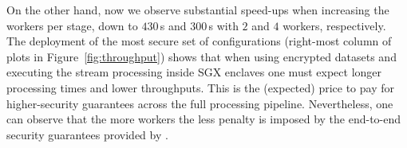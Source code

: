 On the other hand, now we observe substantial speed-ups when increasing the workers per stage, down to $430$\,s and $300$\,s with $2$ and $4$ workers, respectively.
% 
The deployment of the most secure set of configurations (right-most column of plots in Figure~\ref{fig:throughput}) shows that when using encrypted datasets and executing the stream processing inside SGX enclaves one must expect longer processing times and lower throughputs.
This is the (expected) price to pay for higher-security guarantees across the full processing pipeline.
Nevertheless, one can observe that the more workers the less penalty is imposed by the end-to-end security guarantees provided by \SYS{}.






